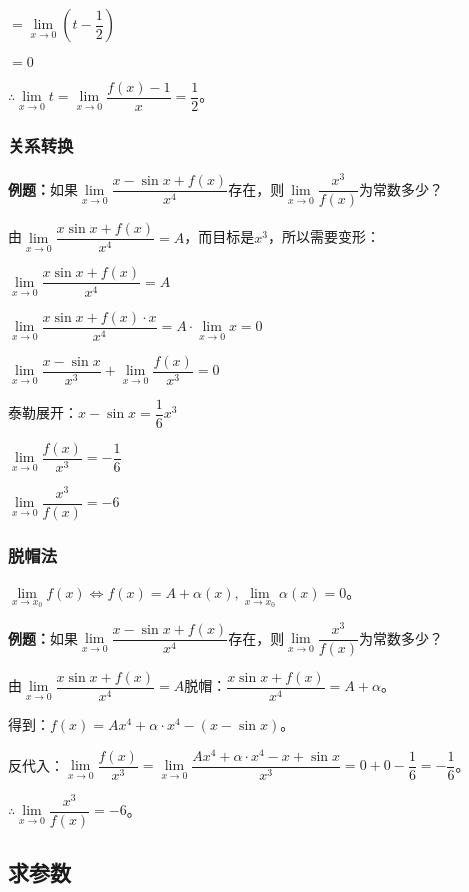 \documentclass[UTF8, 12pt]{ctexart}
\begin{document}
$=\lim\limits_{x\to 0}\left(t-\dfrac{1}{2}\right)$

$=0$

$\therefore\lim\limits_{x\to 0}t=\lim\limits_{x\to 0}\dfrac{f(x)-1}{x}=\dfrac{1}{2}$。

\subsubsection{关系转换}

\textbf{例题：}如果$\lim\limits_{x\to 0}\dfrac{x-\sin x+f(x)}{x^4}$存在，则$\lim\limits_{x\to 0}\dfrac{x^3}{f(x)}$为常数多少？

由$\lim\limits_{x\to 0}\dfrac{x\sin x+f(x)}{x^4}=A$，而目标是$x^3$，所以需要变形：

$\lim\limits_{x\to 0}\dfrac{x\sin x+f(x)}{x^4}=A$

$\lim\limits_{x\to 0}\dfrac{x\sin x+f(x)\cdot x}{x^4}=A\cdot\lim\limits_{x\to 0}x=0$

$\lim\limits_{x\to 0}\dfrac{x-\sin x}{x^3}+\lim\limits_{x\to 0}\dfrac{f(x)}{x^3}=0$

$\text{泰勒展开：}x-\sin x=\dfrac{1}{6}x^3$

$\lim\limits_{x\to 0}\dfrac{f(x)}{x^3}=-\dfrac{1}{6}$

$\lim\limits_{x\to 0}\dfrac{x^3}{f(x)}=-6$

\subsubsection{脱帽法}

$\lim\limits_{x\to x_0}f(x)\Leftrightarrow f(x)=A+\alpha(x),\lim\limits_{x\to x_0}\alpha(x)=0$。

\textbf{例题：}如果$\lim\limits_{x\to 0}\dfrac{x-\sin x+f(x)}{x^4}$存在，则$\lim\limits_{x\to 0}\dfrac{x^3}{f(x)}$为常数多少？

由$\lim\limits_{x\to 0}\dfrac{x\sin x+f(x)}{x^4}=A$脱帽：$\dfrac{x\sin x+f(x)}{x^4}=A+\alpha$。

得到：$f(x)=Ax^4+\alpha\cdot x^4-(x-\sin x)$。

反代入：$\lim\limits_{x\to 0}\dfrac{f(x)}{x^3}=\lim\limits_{x\to 0}\dfrac{Ax^4+\alpha\cdot x^4-x+\sin x}{x^3}=0+0-\dfrac{1}{6}=-\dfrac{1}{6}$。

$\therefore \lim\limits_{x\to 0}\dfrac{x^3}{f(x)}=-6$。

\subsection{求参数}
\end{document}
